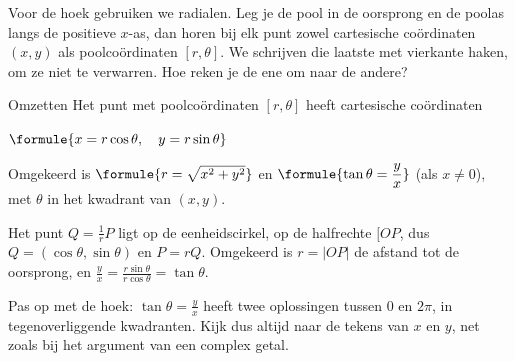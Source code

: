 Voor de hoek gebruiken we radialen. Leg je de pool in de oorsprong en de poolas langs de positieve $x$-as, dan horen bij elk punt zowel cartesische coördinaten $(x, y)$ als poolcoördinaten $[r, \theta]$. We schrijven die laatste met vierkante haken, om ze niet te verwarren. Hoe reken je de ene om naar de andere?

\begin{theorie}
\begin{stelling}{Omzetten}
Het punt met poolcoördinaten $[r, \theta]$ heeft cartesische coördinaten

\vspace{1mm}
\qquad $\formule{x = r\cos\theta, \quad y = r\sin\theta}$

\vspace{1mm}
Omgekeerd is \quad $\formule{r = \sqrt{x^2 + y^2}}$ \quad en \quad $\formule{\tan\theta = \dfrac yx}$ \quad (als $x \neq 0$), met $\theta$ in het kwadrant van $(x, y)$.
\end{stelling}

\begin{bewijs}
Het punt $Q = \tfrac1r P$ ligt op de eenheidscirkel, op de halfrechte $[OP$, dus $Q = (\cos\theta, \sin\theta)$ en $P = rQ$. Omgekeerd is $r = |OP|$ de afstand tot de oorsprong, en $\tfrac yx = \tfrac{r\sin\theta}{r\cos\theta} = \tan\theta$.
\end{bewijs}
\end{theorie}

Pas op met de hoek: $\tan\theta = \tfrac yx$ heeft twee oplossingen tussen $0$ en $2\pi$, in tegenoverliggende kwadranten. Kijk dus altijd naar de tekens van $x$ en $y$, net zoals bij het argument van een complex getal.


